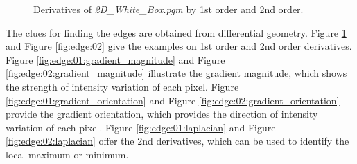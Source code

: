 \documentclass[paper=a4, fontsize=11pt]{scrartcl}
\numberwithin{equation}{section}		%
\numberwithin{figure}{section}			%
\begin{document}
\begin{figure}[h]
\centering
{}
\caption{Derivatives of \emph{2D\_White\_Box.pgm} by 1st order and 2nd order.}
\label{fig:edge:01}
\end{figure}

The clues for finding the edges are obtained from differential geometry.
Figure \ref{fig:edge:01} and Figure \ref{fig:edge:02} give the examples on 1st order and 2nd order derivatives.
Figure \ref{fig:edge:01:gradient_magnitude} and Figure \ref{fig:edge:02:gradient_magnitude} illustrate the gradient magnitude, which shows the strength of intensity variation of each pixel.
Figure \ref{fig:edge:01:gradient_orientation} and Figure \ref{fig:edge:02:gradient_orientation} provide the gradient orientation, which provides the direction of intensity variation of each pixel.
Figure \ref{fig:edge:01:laplacian} and Figure \ref{fig:edge:02:laplacian} offer the 2nd derivatives, which can be used to identify the local maximum or minimum.
\end{document}
